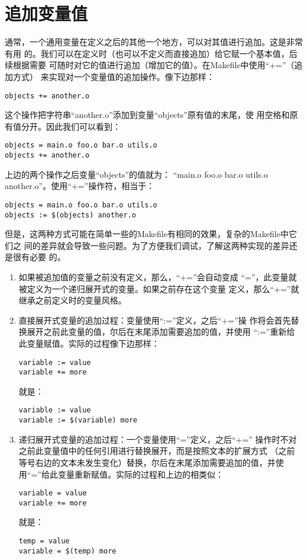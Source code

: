 \section{追加变量值}
通常，一个通用变量在定义之后的其他一个地方，可以对其值进行追加。这是非常有用
的。我们可以在定义时（也可以不定义而直接追加）给它赋一个基本值，后续根据需要
可随时对它的值进行追加（增加它的值）。在Makefile中使用“+=”（追加方式）
来实现对一个变量值的追加操作。像下边那样：
\begin{Verbatim}[]
objects += another.o
\end{Verbatim}

这个操作把字符串“another.o”添加到变量“objects”原有值的末尾，使
用空格和原有值分开。因此我们可以看到：
\begin{Verbatim}[]
objects = main.o foo.o bar.o utils.o
objects += another.o
\end{Verbatim}

上边的两个操作之后变量“objects”的值就为：%
“main.o foo.o bar.o utils.o another.o”。使用“+=”操作符，相当于：
\begin{Verbatim}[]
objects = main.o foo.o bar.o utils.o
objects := $(objects) another.o
\end{Verbatim}

但是，这两种方式可能在简单一些的Makefile有相同的效果，复杂的Makefile中它们之
间的差异就会导致一些问题。为了方便我们调试，了解这两种实现的差异还是很有必要
的。

\begin{enumerate}
\itemsep=4pt \parskip=0pt

\item 如果被追加值的变量之前没有定义，那么，“+=”会自动变成
    “=”，此变量就被定义为一个递归展开式的变量。如果之前存在这个变量
    定义，那么“+=”就继承之前定义时的变量风格。

\item 直接展开式变量的追加过程：变量使用“:=”定义，之后“+=”操
    作将会首先替换展开之前此变量的值，尔后在末尾添加需要追加的值，并使用
    “:=”重新给此变量赋值。实际的过程像下边那样：

\begin{Verbatim}[]
variable := value
variable += more
\end{Verbatim}

就是：

\begin{Verbatim}[]
variable := value
variable := $(variable) more
\end{Verbatim}

\item 递归展开式变量的追加过程：一个变量使用“=”定义，之后“+=”
    操作时不对之前此变量值中的任何引用进行替换展开，而是按照文本的扩展方式
    （之前等号右边的文本未发生变化）替换，尔后在末尾添加需要追加的值，并使
    用“=”给此变量重新赋值。实际的过程和上边的相类似：

\begin{Verbatim}[]
variable = value
variable += more
\end{Verbatim}

就是：

\begin{Verbatim}[]
temp = value
variable = $(temp) more
\end{Verbatim}
\end{enumerate}

